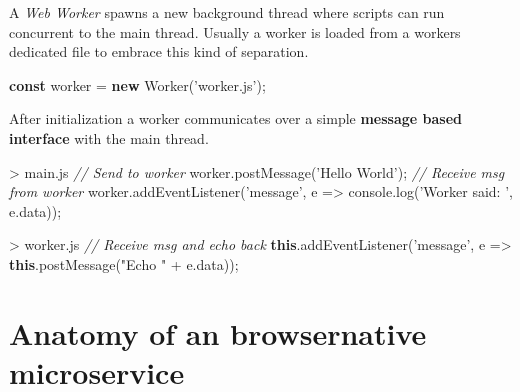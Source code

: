 \documentclass[]{assets/latex/ieee}
\newenvironment{Shaded}{}{}
\newcommand{\KeywordTok}[1]{\textcolor[rgb]{0.00,0.44,0.13}{\textbf{{#1}}}}
\newcommand{\StringTok}[1]{\textcolor[rgb]{0.25,0.44,0.63}{{#1}}}
\newcommand{\CommentTok}[1]{\textcolor[rgb]{0.38,0.63,0.69}{\textit{{#1}}}}
\newcommand{\VariableTok}[1]{\textcolor[rgb]{0.10,0.09,0.49}{{#1}}}
\newcommand{\OperatorTok}[1]{\textcolor[rgb]{0.40,0.40,0.40}{{#1}}}
\newcommand{\AttributeTok}[1]{\textcolor[rgb]{0.49,0.56,0.16}{{#1}}}
\newcommand{\NormalTok}[1]{{#1}}
\begin{document}
A \emph{Web Worker} spawns a new background thread where scripts can run
concurrent to the main thread. Usually a worker is loaded from a workers
dedicated file to embrace this kind of separation.

\begin{Shaded}
\begin{Highlighting}[]
\KeywordTok{const} \NormalTok{worker }\OperatorTok{=} \KeywordTok{new} \AttributeTok{Worker}\NormalTok{(}\StringTok{'worker.js'}\NormalTok{)}\OperatorTok{;}
\end{Highlighting}
\end{Shaded}

After initialization a worker communicates over a simple \textbf{message
based interface} with the main thread.

\begin{Shaded}
\begin{Highlighting}[]
\OperatorTok{>} \VariableTok{main}\NormalTok{.}\AttributeTok{js}
\CommentTok{// Send to worker}
\VariableTok{worker}\NormalTok{.}\AttributeTok{postMessage}\NormalTok{(}\StringTok{'Hello World'}\NormalTok{)}\OperatorTok{;}
\CommentTok{// Receive msg from worker}
\VariableTok{worker}\NormalTok{.}\AttributeTok{addEventListener}\NormalTok{(}\StringTok{'message'}\OperatorTok{,} \NormalTok{e }\OperatorTok{=>}
 \VariableTok{console}\NormalTok{.}\AttributeTok{log}\NormalTok{(}\StringTok{'Worker said: '}\OperatorTok{,} \VariableTok{e}\NormalTok{.}\AttributeTok{data}\NormalTok{))}\OperatorTok{;}
\end{Highlighting}
\end{Shaded}

\begin{Shaded}
\begin{Highlighting}[]
\OperatorTok{>} \VariableTok{worker}\NormalTok{.}\AttributeTok{js}
\CommentTok{// Receive msg and echo back}
\KeywordTok{this}\NormalTok{.}\AttributeTok{addEventListener}\NormalTok{(}\StringTok{'message'}\OperatorTok{,} \NormalTok{e }\OperatorTok{=>}
 \KeywordTok{this}\NormalTok{.}\AttributeTok{postMessage}\NormalTok{(}\StringTok{"Echo "} \OperatorTok{+} \VariableTok{e}\NormalTok{.}\AttributeTok{data}\NormalTok{))}\OperatorTok{;}
\end{Highlighting}
\end{Shaded}

\section{Anatomy of an browsernative
microservice}\label{anatomy-of-an-browsernative-microservice}
\end{document}

